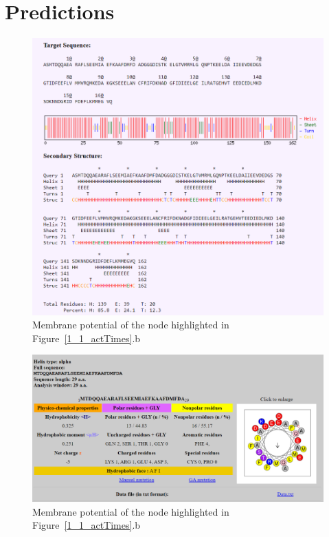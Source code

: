 \documentclass[12pt]{article}
\begin{document}
\section{Predictions}


\begin{figure}[H]
	\centering
	\includegraphics[width=.95\linewidth]{SecondaryStructureAnalysisPlot.png}
	
	\caption{Membrane potential of the node highlighted in Figure~\ref{1_1_actTimes}.b}
	\label{secondStruct}
\end{figure}

\begin{figure}[H]
	\centering
	\includegraphics[width=.95\linewidth]{Helix1_plot.png}
	
	\caption{Membrane potential of the node highlighted in Figure~\ref{1_1_actTimes}.b}
	\label{helix1}
\end{figure}
\end{document}
